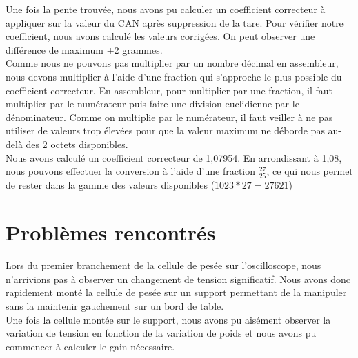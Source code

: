 \documentclass[a4paper,11pt,titlepage]{article}
\begin{document}
Une fois la pente trouvée, nous avons pu calculer un coefficient correcteur à appliquer sur la valeur du CAN après suppression de la tare. Pour vérifier notre coefficient, nous avons calculé les valeurs corrigées. On peut observer une différence de maximum $\pm{2}$ grammes.\\

Comme nous ne pouvons pas multiplier par un nombre décimal en assembleur, nous devons multiplier à l'aide d'une fraction qui s'approche le plus possible du coefficient correcteur. En assembleur, pour multiplier par une fraction, il faut multiplier par le numérateur puis faire une division euclidienne par le dénominateur. Comme on multiplie par le numérateur, il faut veiller à ne pas utiliser de valeurs trop élevées pour que la valeur maximum ne déborde pas au-delà des 2 octets disponibles.\\

Nous avons calculé un coefficient correcteur de 1,07954. En arrondissant à 1,08, nous pouvons effectuer la conversion à l'aide d'une fraction $\frac{27}{25}$, ce qui nous permet de rester dans la gamme des valeurs disponibles ($1023 * 27 = 27621$)\\

\section{Problèmes rencontrés}

Lors du premier branchement de la cellule de pesée sur l'oscilloscope, nous n'arrivions pas à observer un changement de tension significatif. Nous avons donc rapidement monté la cellule de pesée sur un support permettant de la manipuler sans la maintenir gauchement sur un bord de table.\\

Une fois la cellule montée sur le support, nous avons pu aisément observer la variation de tension en fonction de la variation de poids et nous avons pu commencer à calculer le gain nécessaire.
\end{document}
